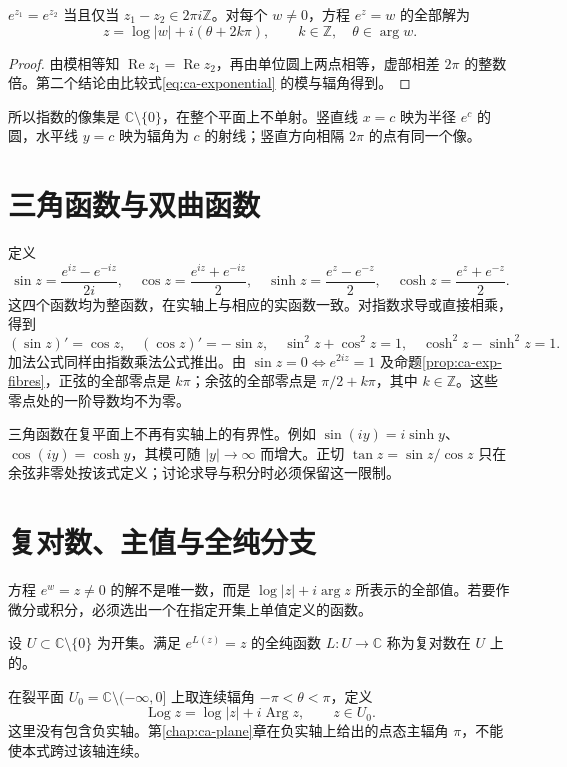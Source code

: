 \documentclass[UTF8,12pt,a4paper,fontset=fandol]{ctexbook}
\begin{document}
\begin{proposition}
\label{prop:ca-exp-fibres}
$e^{z_1}=e^{z_2}$ 当且仅当 $z_1-z_2\in2\pi i\mathbb{Z}$。对每个 $w\ne0$，方程 $e^z=w$ 的全部解为
\[
 z=\log|w|+i(\theta+2k\pi),\qquad k\in\mathbb{Z},\quad \theta\in\arg w.
\]
\end{proposition}
\begin{proof}
由模相等知 $\operatorname{Re}z_1=\operatorname{Re}z_2$，再由单位圆上两点相等，虚部相差 $2\pi$ 的整数倍。第二个结论由比较式\eqref{eq:ca-exponential} 的模与辐角得到。
\end{proof}
所以指数的像集是 $\mathbb{C}\setminus\{0\}$，在整个平面上不单射。竖直线 $x=c$ 映为半径 $e^c$ 的圆，水平线 $y=c$ 映为辐角为 $c$ 的射线；竖直方向相隔 $2\pi$ 的点有同一个像。

\section{三角函数与双曲函数}

定义
\[
 \sin z=\frac{e^{iz}-e^{-iz}}{2i},\quad
 \cos z=\frac{e^{iz}+e^{-iz}}2,\quad
 \sinh z=\frac{e^z-e^{-z}}2,\quad
 \cosh z=\frac{e^z+e^{-z}}2.
\]
这四个函数均为整函数，在实轴上与相应的实函数一致。对指数求导或直接相乘，得到
\[
 (\sin z)'=\cos z,\quad(\cos z)'=-\sin z,\quad
 \sin^2z+\cos^2z=1,\quad \cosh^2z-\sinh^2z=1.
\]
加法公式同样由指数乘法公式推出。由 $\sin z=0\iff e^{2iz}=1$ 及命题\ref{prop:ca-exp-fibres}，正弦的全部零点是 $k\pi$；余弦的全部零点是 $\pi/2+k\pi$，其中 $k\in\mathbb{Z}$。这些零点处的一阶导数均不为零。

三角函数在复平面上不再有实轴上的有界性。例如 $\sin(iy)=i\sinh y$、$\cos(iy)=\cosh y$，其模可随 $|y|\to\infty$ 而增大。正切 $\tan z=\sin z/\cos z$ 只在余弦非零处按该式定义；讨论求导与积分时必须保留这一限制。

\section{复对数、主值与全纯分支}

方程 $e^w=z\ne0$ 的解不是唯一数，而是 $\log|z|+i\arg z$ 所表示的全部值。若要作微分或积分，必须选出一个在指定开集上单值定义的函数。

\begin{definition}[对数分支]
设 $U\subset\mathbb{C}\setminus\{0\}$ 为开集。满足 $e^{L(z)}=z$ 的全纯函数 $L:U\to\mathbb{C}$ 称为复对数在 $U$ 上的。
\end{definition}

在裂平面 $U_0=\mathbb{C}\setminus(-\infty,0]$ 上取连续辐角 $-\pi<\theta<\pi$，定义
\begin{equation}
 \operatorname{Log}z=\log|z|+i\operatorname{Arg}z,\qquad z\in U_0.
 \label{eq:ca-principal-log}
\end{equation}
这里没有包含负实轴。第\ref{chap:ca-plane}章在负实轴上给出的点态主辐角 $\pi$，不能使本式跨过该轴连续。
\end{document}
